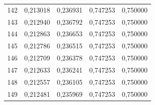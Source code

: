 \begin{tabular}{lrrrr}
142 & 0,213018 & 0,236931 & 0,747253 & 0,750000 \\
143 & 0,212940 & 0,236792 & 0,747253 & 0,750000 \\
144 & 0,212863 & 0,236653 & 0,747253 & 0,750000 \\
145 & 0,212786 & 0,236515 & 0,747253 & 0,750000 \\
146 & 0,212709 & 0,236378 & 0,747253 & 0,750000 \\
147 & 0,212633 & 0,236241 & 0,747253 & 0,750000 \\
148 & 0,212557 & 0,236105 & 0,747253 & 0,750000 \\
149 & 0,212481 & 0,235969 & 0,747253 & 0,750000 \\
\bottomrule
\end{tabular}

